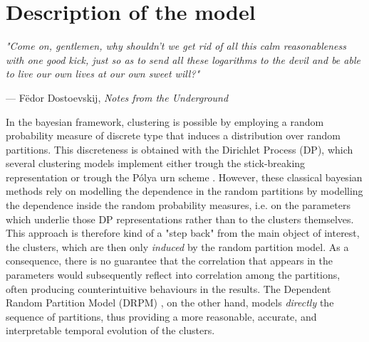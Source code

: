 \documentclass[12pt,	%
	a4paper,		%
	twoside,		%
	openright,		%
	titlepage,%
	]{book}
\theoremstyle{definition}
\begin{document}
\chapter{Description of the model}
\label{cap: description of the model}

\epigraph{\itshape
"Come on, gentlemen, why shouldn't we get rid of all this calm reasonableness with one good kick, just so as to send all these logarithms to the devil and be able to live our own lives at our own sweet will?"
}{--- F\"{e}dor Dostoevskij, \textit{Notes from the Underground}}

In the bayesian framework, clustering is possible by employing a random probability measure of discrete type that induces a distribution over random partitions. This discreteness is obtained with the Dirichlet Process (DP), which several clustering models implement either trough the stick-breaking representation \cite{stick-br1} \cite{stick-br2} \cite{stick-br3} \cite{stick-br4} \cite{stick-br5} \cite{stick-br6} \cite{stick-br7} or trough the P\'{o}lya urn scheme \cite{polya-competitor}. However, these classical bayesian methods rely on modelling the dependence in the random partitions by modelling the dependence inside the random probability measures, i.e. on the parameters which underlie those DP representations rather than to the clusters themselves. This approach is therefore kind of a "step back" from the main object of interest, the clusters, which are then only \textit{induced} by the random partition model. As a consequence, there is no guarantee that the correlation that appears in the parameters would subsequently reflect into correlation among the partitions, often producing counterintuitive behaviours in the results. The Dependent Random Partition Model (DRPM) \cite{1-drpm}, on the other hand, models \textit{directly} the sequence of partitions, thus providing a more reasonable, accurate, and interpretable temporal evolution of the clusters.
\end{document}
